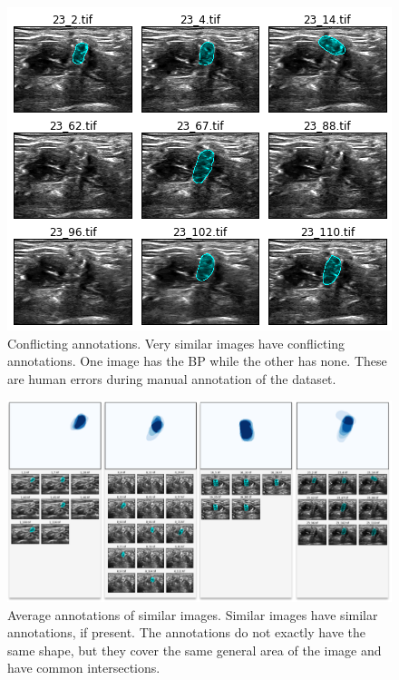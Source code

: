 \documentclass{article}
\begin{document}
\begin{figure}[h]
 \centering
  \includegraphics[width=1.0\linewidth]{figures/conflicting.png}
  \caption{
      Conflicting annotations. Very similar images have conflicting annotations. One image has the BP while the other has none. These are human errors during manual annotation of the dataset.
  }
  \label{fig:conflicting}
\end{figure}


\begin{figure}[h]
 \centering
  \includegraphics[width=1.0\linewidth]{figures/average_loc.png}
  \caption{
      Average annotations of similar images. Similar images have similar annotations, if present. The annotations do not exactly have the same shape, but they cover the same general area of the image and have common intersections.
  }
  \label{fig:average_loc}
\end{figure}
\end{document}
